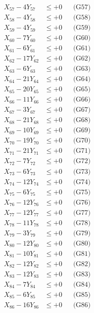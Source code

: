 \documentclass[a4paper,10pt]{article}
\begin{document}
{\begin{align}
X_{57} - 4Y_{57} &\leq +0 && \text{(G57)} \\
\allowbreak
X_{58} - 4Y_{58} &\leq +0 && \text{(G58)} \\
X_{59} - 4Y_{59} &\leq +0 && \text{(G59)} \\
X_{60} - 7Y_{60} &\leq +0 && \text{(G60)} \\
X_{61} - 6Y_{61} &\leq +0 && \text{(G61)} \\
X_{62} - 17Y_{62} &\leq +0 && \text{(G62)} \\
X_{63} - 6Y_{63} &\leq +0 && \text{(G63)} \\
X_{64} - 21Y_{64} &\leq +0 && \text{(G64)} \\
X_{65} - 20Y_{65} &\leq +0 && \text{(G65)} \\
X_{66} - 11Y_{66} &\leq +0 && \text{(G66)} \\
X_{67} - 3Y_{67} &\leq +0 && \text{(G67)} \\
\allowbreak
X_{68} - 21Y_{68} &\leq +0 && \text{(G68)} \\
X_{69} - 10Y_{69} &\leq +0 && \text{(G69)} \\
X_{70} - 19Y_{70} &\leq +0 && \text{(G70)} \\
X_{71} - 21Y_{71} &\leq +0 && \text{(G71)} \\
X_{72} - 7Y_{72} &\leq +0 && \text{(G72)} \\
X_{73} - 6Y_{73} &\leq +0 && \text{(G73)} \\
X_{74} - 12Y_{74} &\leq +0 && \text{(G74)} \\
X_{75} - 6Y_{75} &\leq +0 && \text{(G75)} \\
X_{76} - 12Y_{76} &\leq +0 && \text{(G76)} \\
X_{77} - 12Y_{77} &\leq +0 && \text{(G77)} \\
\allowbreak
X_{78} - 11Y_{78} &\leq +0 && \text{(G78)} \\
X_{79} - 3Y_{79} &\leq +0 && \text{(G79)} \\
X_{80} - 12Y_{80} &\leq +0 && \text{(G80)} \\
X_{81} - 10Y_{81} &\leq +0 && \text{(G81)} \\
X_{82} - 12Y_{82} &\leq +0 && \text{(G82)} \\
X_{83} - 12Y_{83} &\leq +0 && \text{(G83)} \\
X_{84} - 7Y_{84} &\leq +0 && \text{(G84)} \\
X_{85} - 6Y_{85} &\leq +0 && \text{(G85)} \\
X_{86} - 16Y_{86} &\leq +0 && \text{(G86)} \\

\end{align}}
\end{document}
